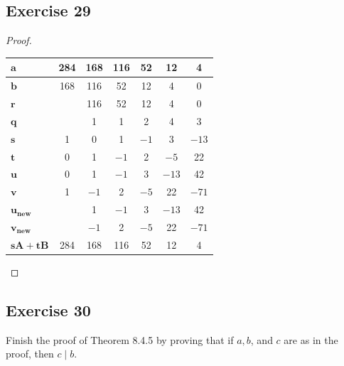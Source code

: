 \documentclass[14pt]{extarticle}
\begin{document}
\subsection{Exercise 29}
\begin{proof}
        \begin{center}
                \begin{tabular}{|l|c|c|c|c|c|c|}
                        \hline
                        \(\bm{a}\)       & 284 & 168  & 116  & 52   & 12    & 4     \\
                        \hline
                        \(\bm{b}\)       & 168 & 116  & 52   & 12   & 4     & 0     \\
                        \hline
                        \(\bm{r}\)       &     & 116  & 52   & 12   & 4     & 0     \\
                        \hline
                        \(\bm{q}\)       &     & 1    & 1    & 2    & 4     & 3     \\
                        \hline
                        \(\bm{s}\)       & 1   & 0    & 1    & $-1$ & 3     & $-13$ \\
                        \hline
                        \(\bm{t}\)       & 0   & 1    & $-1$ & 2    & $-5$  & 22    \\
                        \hline
                        \(\bm{u}\)       & 0   & 1    & $-1$ & 3    & $-13$ & 42    \\
                        \hline
                        \(\bm{v}\)       & 1   & $-1$ & 2    & $-5$ & 22    & $-71$ \\
                        \hline
                        \(\bm{u_{new}}\) &     & 1    & $-1$ & 3    & $-13$ & 42    \\
                        \hline
                        \(\bm{v_{new}}\) &     & $-1$ & 2    & $-5$ & 22    & $-71$ \\
                        \hline
                        \(\bm{sA+tB}\)   & 284 & 168  & 116  & 52   & 12    & 4     \\
                        \hline
                \end{tabular}
        \end{center}
\end{proof}

\subsection{Exercise 30}
Finish the proof of Theorem 8.4.5 by proving that if \(a, b\), and $c$ are as in the proof, then \(c \mid b\).
\end{document}
